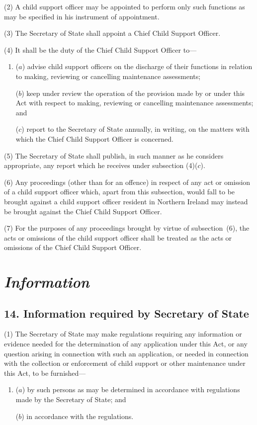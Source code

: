 \documentclass[12pt,a4paper]{article}
\begin{document}
(2) A child support officer may be appointed to perform only such functions as may be specified in his instrument of appointment.

(3) The Secretary of State shall appoint a Chief Child Support Officer.

(4) It shall be the duty of the Chief Child Support Officer to—
\begin{enumerate}\item[]
($a$) advise child support officers on the discharge of their functions in relation to making, reviewing or cancelling maintenance assessments;

($b$) keep under review the operation of the provision made by or under this Act with respect to making, reviewing or cancelling maintenance assessments; and

($c$) report to the Secretary of State annually, in writing, on the matters with which the Chief Child Support Officer is concerned.
\end{enumerate}

(5) The Secretary of State shall publish, in such manner as he considers appropriate, any report which he receives under subsection (4)($c$).

(6) Any proceedings (other than for an offence) in respect of any act or omission of a child support officer which, apart from this subsection, would fall to be brought against a child support officer resident in Northern Ireland may instead be brought against the Chief Child Support Officer.

(7) For the purposes of any proceedings brought by virtue of subsection~(6), the acts or omissions of the child support officer shall be treated as the acts or omissions of the Chief Child Support Officer.


\section{\itshape Information}

\subsection{14. Information required by Secretary of State}

(1) The Secretary of State may make regulations requiring any information or evidence needed for the determination of any application under this Act, or any question arising in connection with such an application, or needed in connection with the collection or enforcement of child support or other maintenance under this Act, to be furnished—
\begin{enumerate}\item[]
($a$) by such persons as may be determined in accordance with regulations made by the Secretary of State; and

($b$) in accordance with the regulations.
\end{enumerate}
\end{document}
